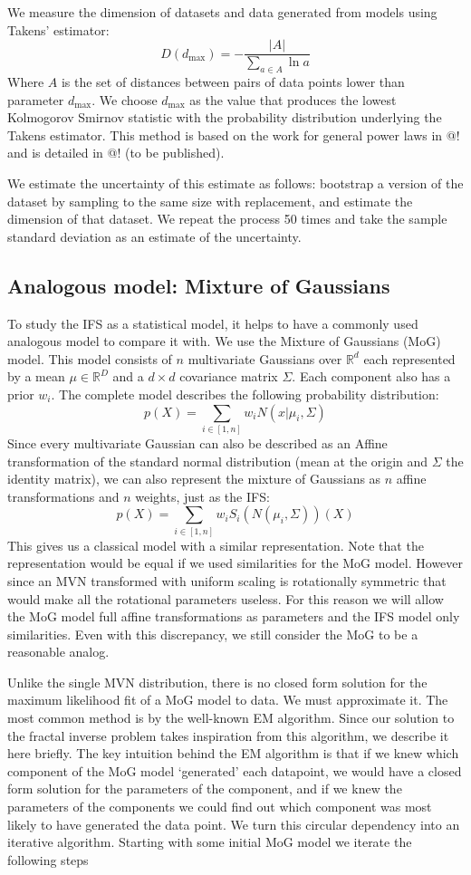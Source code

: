 \documentclass[10pt]{article}
\theoremstyle{definition}
\begin{document}
We measure the dimension of datasets and data generated from models using Takens' estimator:
\[
D(d_{\mbox{max}}) = -\frac{|A|}{\sum_{a \in A} \ln a} 
\]
Where $A$ is the set of distances between pairs of data points lower than parameter $d_{\mbox{max}}$. We choose $d_{\mbox{max}}$ as the value that produces the lowest Kolmogorov Smirnov statistic with the probability distribution underlying the Takens estimator. This method is based on the work for general power laws in @! and is detailed in @! (to be published). 

We estimate the uncertainty of this estimate as follows: bootstrap a version of the dataset by sampling to the same size with replacement, and estimate the dimension of that dataset. We repeat the process 50 times and take the sample standard deviation as an estimate of the uncertainty.

\subsection{Analogous model: Mixture of Gaussians}

To study the IFS as a statistical model, it helps to have a commonly used analogous model to compare it with. We use the Mixture of Gaussians (MoG) model. This model consists of $n$ multivariate Gaussians over ${\mathbb R}^d$ each represented by a mean $\mu \in {\mathbb R}^D$ and a $d \times d$ covariance matrix $\Sigma$. Each component also has a prior $w_i$. The complete model describes the following probability distribution:
\[
p(X) = \sum_{i \in [1,n]} w_i N(x|\mu_i, \Sigma)
\]
Since every multivariate Gaussian can also be described as an Affine transformation of the standard normal distribution (mean at the origin and $\Sigma$ the identity matrix), we can also represent the mixture of Gaussians as $n$ affine transformations and $n$ weights, just as the IFS:
\[
p(X) = \sum_{i \in [1,n]} w_i S_i(N(\mu_i, \Sigma))(X)
\]
This gives us a classical model with a similar representation. Note that the representation would be equal if we used similarities for the MoG model. However since an MVN transformed with uniform scaling is rotationally symmetric that would make all the rotational parameters useless. For this reason we will allow the MoG model full affine transformations as parameters and the IFS model only similarities. Even with this discrepancy, we still consider the MoG to be a reasonable analog.

Unlike the single MVN distribution, there is no closed form solution for the maximum likelihood fit of a MoG model to data. We must approximate it. The most common method is by the well-known EM algorithm. Since our solution to the fractal inverse problem takes inspiration from this algorithm, we describe it here briefly. The key intuition behind the EM algorithm is that if we knew which component of the MoG model `generated' each datapoint, we would have a closed form solution for the parameters of the component, and if we knew the parameters of the components we could find out which component was most likely to have generated the data point. We turn this circular dependency into an iterative algorithm. Starting with some initial MoG model we iterate the following steps
\end{document}
